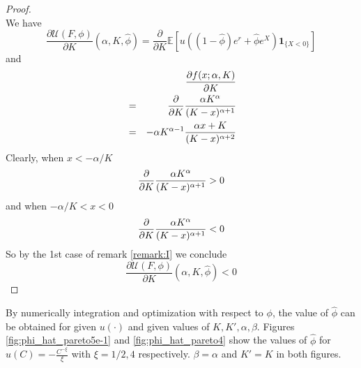 \documentclass{article}
\newcommand{\pd}[2]{
  \frac{\partial #1}{\partial #2}
}
\newcommand{\opd}[1]{
  \frac{\partial}{\partial #1}
}
\newcommand{\E}{
  \mathbb{E}
}
\newcommand{\1}[1]{
  \mathbf{1}_{\{#1\}}
}
\begin{document}
\begin{proof}
\[  \]
  We have
  \[
  \pd{\mathcal U(F, \phi)}{K}(\alpha, K, \hat\phi)
  = \opd{K} \E \left[
    u((1 - \hat\phi) e^r + \hat\phi e^X) \1{X < 0}
  \right] 
  \]
  and
  \begin{eqnarray*}
    && \pd{f(x; \alpha, K)}{K} \\
    &=& \opd{K} {\alpha K^\alpha \over (K - x)^{\alpha + 1}} \\
    &=&
    -\alpha K^{\alpha - 1} {
      \alpha x + K
      \over
      (K - x)^{\alpha + 2}
    }
  \end{eqnarray*}
  Clearly, when $x < -\alpha/K$
  \[
  \opd{K} {\alpha K^\alpha \over (K - x)^{\alpha + 1}} > 0
  \]
  and when $-\alpha/K < x < 0$
  \[
  \opd{K} {\alpha K^\alpha \over (K - x)^{\alpha + 1}} < 0
  \]
  So by the 1st case of remark \ref{remark:I} we conclude
  \[
  \pd{\mathcal U(F, \phi)}{K}(\alpha, K, \hat\phi) < 0  
  \]
\end{proof}
By numerically integration and optimization with respect to $\phi$,
the value of $\hat\phi$ can be obtained for given $u(\cdot)$ and given
values of $K, K', \alpha, \beta$. Figures \ref{fig:phi_hat_pareto5e-1}
and \ref{fig:phi_hat_pareto4} show the values of $\hat\phi$ for
$u(C) = -\frac{C^{-\xi}}{\xi}$ with $\xi = 1/2, 4$ respectively.
$\beta=\alpha$ and $K'=K$ in both figures.
\end{document}
